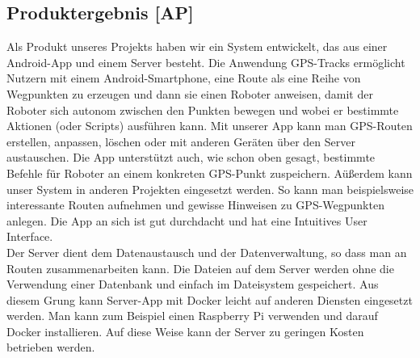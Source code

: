 \documentclass[10pt]{article}
\begin{document}
\subsection{Produktergebnis [AP]}
    Als Produkt unseres Projekts haben wir ein System entwickelt, das aus einer Android-App und einem Server besteht.
    Die Anwendung GPS-Tracks ermöglicht Nutzern mit einem Android-Smartphone, eine Route als eine Reihe von Wegpunkten zu erzeugen 
    und dann sie einen Roboter anweisen, damit der Roboter sich autonom zwischen den Punkten bewegen und wobei er bestimmte Aktionen (oder Scripts) ausführen kann. 
    Mit unserer App kann man GPS-Routen erstellen, anpassen, löschen oder mit anderen Geräten über den Server austauschen. Die App unterstützt auch, wie schon oben gesagt, bestimmte Befehle für Roboter
    an einem konkreten GPS-Punkt zuspeichern. Aüßerdem kann unser System in anderen Projekten eingesetzt werden. So kann man beispielsweise interessante Routen aufnehmen und gewisse Hinweisen zu GPS-Wegpunkten anlegen.
    Die App an sich ist gut durchdacht und hat eine Intuitives User Interface. \\ 
    Der Server dient dem Datenaustausch und der Datenverwaltung, so dass man an Routen zusammenarbeiten kann. Die Dateien auf dem Server werden ohne die Verwendung einer Datenbank
    und einfach im Dateisystem gespeichert. Aus diesem Grung kann Server-App mit Docker leicht auf anderen Diensten eingesetzt werden. Man kann zum Beispiel einen Raspberry Pi verwenden und darauf
    Docker installieren. Auf diese Weise kann der Server zu geringen Kosten betrieben werden. 
\end{document}
